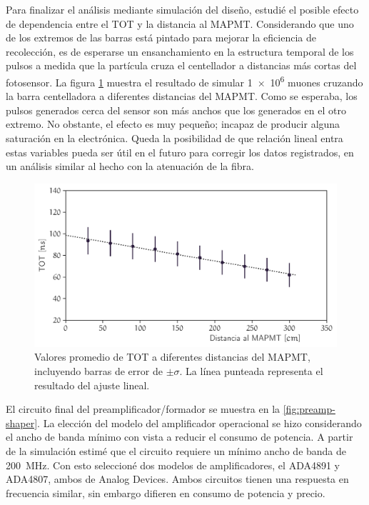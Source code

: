 Para finalizar el análisis mediante simulación del diseño, estudié el posible efecto de dependencia entre el TOT y la distancia al MAPMT. Considerando que uno de los extremos de las barras está pintado para mejorar la eficiencia de recolección, es de esperarse un ensanchamiento en la estructura temporal de los pulsos a medida que la partícula cruza el centellador a distancias más cortas del fotosensor. La figura \ref{fig:tot-distance} muestra el resultado de simular \num{1e6} muones cruzando la barra centelladora a diferentes distancias del MAPMT. Como se esperaba, los pulsos generados cerca del sensor son más anchos que los generados en el otro extremo. No obstante, el efecto es muy pequeño; incapaz de producir alguna saturación en la electrónica. Queda la posibilidad de que relación lineal entra estas variables pueda ser útil en el futuro para corregir los datos registrados, en un análisis similar al hecho con la atenuación de la fibra.

\begin{figure}
        \centering
        \includegraphics[width=\textwidth]{tot_distance.pdf}
        \caption{Valores promedio de TOT a diferentes distancias del MAPMT, incluyendo barras de error de $\pm\sigma$. La línea punteada representa el resultado del ajuste lineal.}
        \label{fig:tot-distance}
\end{figure}

El circuito final del preamplificador/formador se muestra en la \ref{fig:preamp-shaper}. La elección del modelo del amplificador operacional se hizo considerando el ancho de banda mínimo con vista a reducir el consumo de potencia. A partir de la simulación estimé que el circuito requiere un mínimo ancho de banda de \SI{200}{\mega\hertz}. Con esto seleccioné dos modelos de amplificadores, el ADA4891 y ADA4807, ambos de Analog Devices. Ambos circuitos tienen una respuesta en frecuencia similar, sin embargo difieren en consumo de potencia y precio.

